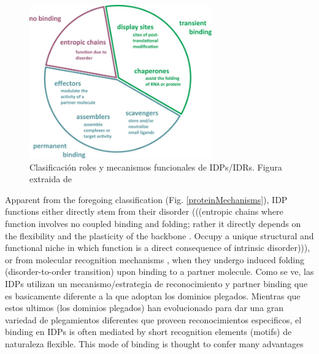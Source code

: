 \begin{figure}[h!,centered]
\centering
\includegraphics[width=0.7\textwidth]{img/idpFunctionMechanisms.jpg} 
\caption{Clasificación roles y mecanismos funcionales de IDPs/IDRs. Figura extraida de \cite{van2014classification}}
\label{idpFunctions}
\end{figure}


Apparent from the foregoing classification (Fig. \ref{proteinMechanisms}), IDP functions either directly stem from their disorder (((entropic chains where function involves no coupled binding and folding;
rather it directly depends on the flexibility and the plasticity of the backbone . Occupy a unique structural and functional niche in which function is a direct consequence of intrinsic disorder))), 
or from molecular recognition mechanisms , when they undergo induced folding (disorder-to-order transition) upon binding to a partner molecule. %
Como se ve, las IDPs utilizan un mecanismo/estrategia de reconocimiento y partner binding que es basicamente diferente a la que adoptan los dominios plegados.
Mientras que estos ultimos (los dominios plegados) han evolucionado para dar una gran variedad de plegamientos diferentes que proveen reconocimientos especificos, 
el binding en IDPs is often mediated by short recognition elements (motifs)\cite{neduva2005systematic,fuxreiter2007local} de naturaleza flexible.
This mode of binding is thought to confer many advantages \cite{gunasekaran2003extended,dyson2005intrinsically}%



